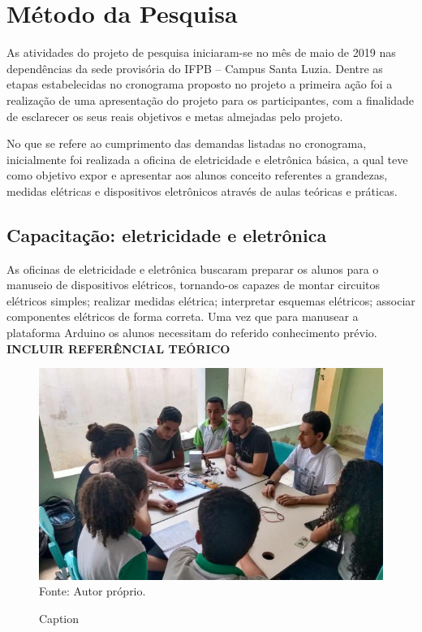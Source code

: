 \section{Método da Pesquisa}
As atividades do projeto de pesquisa iniciaram-se no mês de maio de 2019 nas dependências da sede provisória do IFPB – Campus Santa Luzia. Dentre as etapas estabelecidas no cronograma proposto no projeto a primeira ação foi a realização de uma apresentação do projeto para os participantes, com a finalidade de esclarecer os seus reais objetivos e metas almejadas pelo projeto.\par
No que se refere ao cumprimento das demandas listadas no cronograma, inicialmente foi realizada a oficina de eletricidade e eletrônica básica, a qual teve como objetivo expor e apresentar aos alunos conceito referentes a grandezas, medidas elétricas e dispositivos eletrônicos através de aulas teóricas e práticas.

\subsection{Capacitação: eletricidade e eletrônica}
As oficinas de eletricidade e eletrônica buscaram preparar os alunos para o manuseio de dispositivos elétricos, tornando-os capazes de montar circuitos elétricos simples; realizar medidas elétrica; interpretar esquemas elétricos; associar componentes elétricos de forma correta. Uma vez que para manusear a plataforma Arduino os alunos necessitam do referido conhecimento prévio.
\textbf{INCLUIR REFERÊNCIAL TEÓRICO}

\begin{figure}[H] %
    \centering %
    \caption{Caption}
    \includegraphics[scale=0.3]{lib/figuras/aula1_eletrica_eletronica.png}
    \\
    {\footnotesize Fonte: Autor próprio.}
    \label{fig:aula01_eletrica}
\end{figure}

\subsection{}